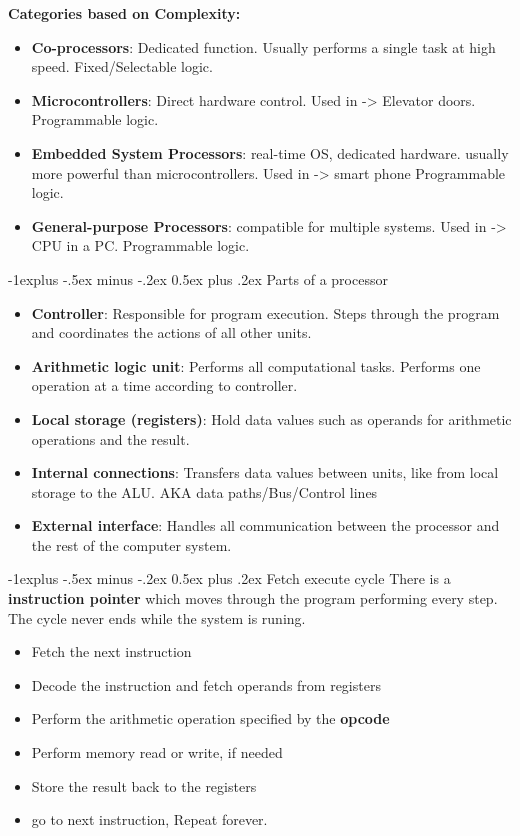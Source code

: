 \documentclass[letterpaper, 8pt]{extarticle}
\makeatletter
\renewcommand{\subsection}{\@startsection{subsection}{2}{0mm}%
                                {-1explus -.5ex minus -.2ex}%
                                {0.5ex plus .2ex}%
                                {\normalfont\small\bfseries}}
\makeatother
\begin{document}
\begin{multicols*}{4}
	\textbf{Categories based on Complexity:} \\
	\begin{itemize}
		\item \textbf{Co-processors}: Dedicated function. Usually performs a single task at high speed. Fixed/Selectable logic.
		\item \textbf{Microcontrollers}: Direct hardware control. Used in -> Elevator doors. Programmable logic.
		\item \textbf{Embedded System Processors}: real-time OS, dedicated hardware. usually more powerful than microcontrollers. Used in -> smart phone Programmable logic.
		\item \textbf{General-purpose Processors}: compatible for multiple systems. Used in -> CPU in a PC. Programmable logic.
	\end{itemize}

	\subsection{Parts of a processor}
	\begin{itemize}
		\item \textbf{Controller}: Responsible for program execution. Steps through the program and coordinates the actions of all other units.
		\item \textbf{Arithmetic logic unit}: Performs all computational tasks. Performs one operation at a time according to controller.
		\item \textbf{Local storage (registers)}: Hold data values such as operands for arithmetic operations and the result.
		\item \textbf{Internal connections}: Transfers data values between units, like from local storage to the ALU. AKA data paths/Bus/Control lines
		\item \textbf{External interface}: Handles all communication between the processor and the rest of the computer system.
	\end{itemize}

	\subsection{Fetch execute cycle}
	There is a \textbf{instruction pointer} which moves through the program performing every step. The cycle never ends while the system is runing.
	\begin{itemize}
		\item Fetch the next instruction
		\item Decode the instruction and fetch operands from registers
		\item Perform the arithmetic operation specified by the \textbf{opcode}
		\item Perform memory read or write, if needed
		\item Store the result back to the registers
		\item go to next instruction, Repeat forever.
	\end{itemize}


\end{multicols*}
\end{document}
